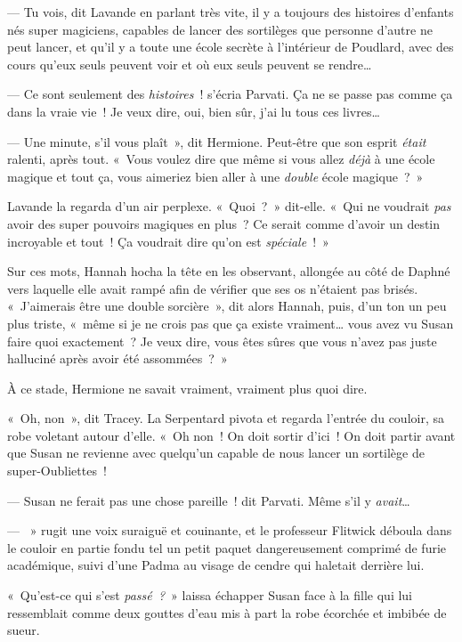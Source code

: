 --- Tu vois, dit Lavande en parlant très vite, il y a toujours des histoires d'enfants nés super magiciens, capables de lancer des sortilèges que personne d'autre ne peut lancer, et qu'il y a toute une école secrète à l'intérieur de Poudlard, avec des cours qu'eux seuls peuvent voir et où eux seuls peuvent se rendre…

--- Ce sont seulement des \emph{histoires}~! s'écria Parvati. Ça ne se passe pas comme ça dans la vraie vie~! Je veux dire, oui, bien sûr, j'ai lu tous ces livres…

--- Une minute, s'il vous plaît~», dit Hermione. Peut-être que son esprit \emph{était} ralenti, après tout. «~Vous voulez dire que même si vous allez \emph{déjà} à une école magique et tout ça, vous aimeriez bien aller à une \emph{double} école magique~?~»

Lavande la regarda d'un air perplexe. «~Quoi~?~» dit-elle. «~Qui ne voudrait \emph{pas} avoir des super pouvoirs magiques en plus~? Ce serait comme d'avoir un destin incroyable et tout~! Ça voudrait dire qu'on est \emph{spéciale}~!~»

Sur ces mots, Hannah hocha la tête en les observant, allongée au côté de Daphné vers laquelle elle avait rampé afin de vérifier que ses os n'étaient pas brisés. «~J'aimerais être une double sorcière~», dit alors Hannah, puis, d'un ton un peu plus triste, «~même si je ne crois pas que ça existe vraiment… vous avez vu Susan faire quoi exactement~? Je veux dire, vous êtes sûres que vous n'avez pas juste halluciné après avoir été assommées~?~»

À ce stade, Hermione ne savait vraiment, vraiment plus quoi dire.

«~Oh, non~», dit Tracey. La Serpentard pivota et regarda l'entrée du couloir, sa robe voletant autour d'elle. «~Oh non~! On doit sortir d'ici~! On doit partir avant que Susan ne revienne avec quelqu'un capable de nous lancer un sortilège de super-Oubliettes~!

--- Susan ne ferait pas une chose pareille~! dit Parvati. Même s'il y \emph{avait}…

--- ~» rugit une voix suraiguë et couinante, et le professeur Flitwick déboula dans le couloir en partie fondu tel un petit paquet dangereusement comprimé de furie académique, suivi d'une Padma au visage de cendre qui haletait derrière lui.

\later

«~Qu'est-ce qui s'est \emph{passé~?}~» laissa échapper Susan face à la fille qui lui ressemblait comme deux gouttes d'eau mis à part la robe écorchée et imbibée de sueur.

